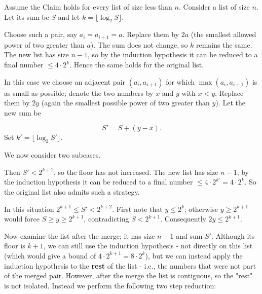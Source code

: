 \smallskip
{}
Assume the Claim holds for every list of size less than \(n\). Consider a list of size \(n\). Let its sum be \(S\) and let \(k = \lfloor \log_2 S \rfloor\).\par
{}
Choose such a pair, say \(a_i = a_{i+1} = a\). Replace them by \(2a\) (the smallest allowed power of two greater than \(a\)). The sum does not change, so \(k\) remains the same. The new list has size \(n-1\), so by the induction hypothesis it can be reduced to a final number \(\le 4 \cdot 2^{k}\). Hence the same holds for the original list.\par
{}
In this case we choose an adjacent pair \((a_i, a_{i+1})\) for which \(\max(a_i, a_{i+1})\) is as small as possible; denote the two numbers by \(x\) and \(y\) with \(x < y\). Replace them by \(2y\) (again the smallest possible power of two greater than \(y\)). Let the new sum be\par
\[
S' = S + (y - x).
\]
Set \(k' = \lfloor \log_2 S' \rfloor\).\par
We now consider two subcases.\par
{}
Then \(S' < 2^{k+1}\), so the floor has not increased. The new list has size \(n-1\); by the induction hypothesis it can be reduced to a final number \(\le 4 \cdot 2^{k'} = 4 \cdot 2^{k}\). So the original list also admits such a strategy.\par
{}
In this situation \(2^{k+1} \le S' < 2^{k+2}\). First note that \(y \le 2^{k}\); otherwise \(y \ge 2^{k+1}\) would force \(S \ge y \ge 2^{k+1}\), contradicting \(S < 2^{k+1}\). Consequently \(2y \le 2^{k+1}\).\par
Now examine the list after the merge; it has size \(n-1\) and sum \(S'\). Although its floor is \(k+1\), we can still use the induction hypothesis - not directly on this list (which would give a bound of \(4 \cdot 2^{k+1} = 8 \cdot 2^{k}\)), but we can instead apply the induction hypothesis to the \textbf{rest} of the list - i.e., the numbers that were not part of the merged pair. However, after the merge the list is contiguous, so the "rest" is not isolated. Instead we perform the following two step reduction:\par
